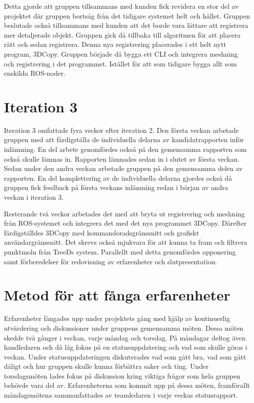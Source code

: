 Detta gjorde att gruppen tillsammans med kunden fick revidera en stor del av projektet där gruppen bortsåg från det tidigare systemet helt och hållet. Gruppen beslutade också tillsammans med kunden att det borde vara lättare att registrera mer detaljerade objekt. Gruppen gick då tillbaka till algoritmen för att placera rätt och sedan registrera. Denna nya registrering placerades i ett helt nytt program, 3DCopy. Gruppen började då bygga ett CLI och integrera meshning och registrering i det programmet. Istället för att som tidigare bygga allt som enskilda ROS-noder.

\section{Iteration 3}

Iteration 3 omfattade fyra veckor efter iteration 2. Den första veckan arbetade gruppen med att färdigställa de individuella delarna av kandidatrapporten inför inlämning. En del arbete genomfördes också på den gemensamma rapporten som också skulle lämnas in. Rapporten lämnades sedan in i slutet av första veckan. Sedan under den andra veckan arbetade gruppen på den gemensamma delen av rapporten. En del komplettering av de individuella delarna gjordes också då gruppen fick feedback på första veckans inlämning redan i början av andra veckan i iteration 3.

Resterande två veckor arbetades det med att bryta ut registrering och meshning från ROS-systemet och integrera det med det nya programmet 3DCopy. Därefter färdigställdes 3DCopy med kommandoradsgränssnitt och grafiskt användargränssnitt. Det skrevs också mjukvara för att kunna ta fram och filtrera punktmoln från TreeDs system. Parallellt med detta genomfördes opponering samt förberedelser för redovisning av erfarenheter och slutp\-resentation.  


\section{Metod för att fånga erfarenheter}

Erfarenheter fångades upp under projektets gång med hjälp av kontinuerlig utvärdering och diskussioner under gruppens gemensamma möten. Dessa möten skedde två gånger i veckan, varje måndag och torsdag. På måndagar deltog även handledaren och då låg fokus på en statusuppdatering och vad som skulle göras i veckan. Under statusuppdateringen diskuterades vad som gått bra, vad som gått dåligt och hur gruppen skulle kunna förbättra saker och ting. Under torsdagsmöten lades fokus på diskussion kring viktiga frågor som hela gruppen behövde vara del av. Erfarenheterna som kommit upp på dessa möten, framförallt måndagsmötena sammanfattades av teamledaren i varje veckas statusrapport.

